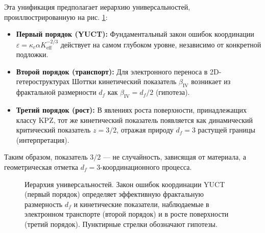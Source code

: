 \documentclass[12pt,a4paper]{article}
\begin{document}
	Эта унификация предполагает иерархию универсальностей, проиллюстрированную
	на рис. \ref{fig:hierarchy}:
	\begin{itemize}
		\item \textbf{Первый порядок (YUCT):} Фундаментальный закон ошибок
		координации $\varepsilon = \kappa_c \alpha K_{\mathrm{eff}}^{-2/3}$
		действует на самом глубоком уровне, независимо от конкретной подложки.
		\item \textbf{Второй порядок (транспорт):} Для электронного переноса в
		2D-гетероструктурах Шоттки кинетический показатель $\beta_{\mathrm{IV}}$
		возникает из фрактальной размерности $d_f$ как $\beta_{\mathrm{IV}} = d_f/2$
		(гипотеза).
		\item \textbf{Третий порядок (рост):} В явлениях роста поверхности,
		принадлежащих классу KPZ, тот же кинетический показатель появляется как
		динамический критический показатель $z = 3/2$, отражая природу $d_f = 3$
		растущей границы (интерпретация).
	\end{itemize}
	Таким образом, показатель $3/2$ — не случайность, зависящая от материала,
	а геометрическая отметка $d_f = 3$-координационного процесса.
	
	\begin{figure}[htbp]
		\centering
		\caption{Иерархия универсальностей. Закон ошибок координации YUCT
			(первый порядок) определяет эффективную фрактальную размерность $d_f$
			и кинетические показатели, наблюдаемые в электронном транспорте
			(второй порядок) и в росте поверхности (третий порядок). Пунктирные
			стрелки обозначают гипотезы.}
		\label{fig:hierarchy}
	\end{figure}
	
\end{document}
